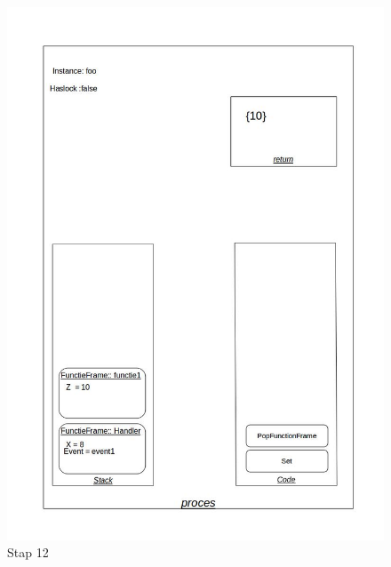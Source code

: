 \documentclass[]{article}
\begin{document}
\begin{figure}[H]
\centering
\includegraphics[scale=0.4]{AnalyseADTAlgorithm/processtappen/stap10.jpg}
\caption{Stap 12}
\end{figure}
\end{document}
